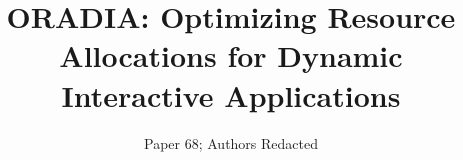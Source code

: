 \documentclass[pageno]{jpaper}
\newcommand{\pacora}{ORADIA\xspace}
\begin{document}
\title{\pacora: Optimizing Resource Allocations for Dynamic Interactive Applications}
\author{Paper 68; Authors Redacted}
\date{}
\maketitle

\thispagestyle{empty}








%




%



%
%
%
%
\end{document}
